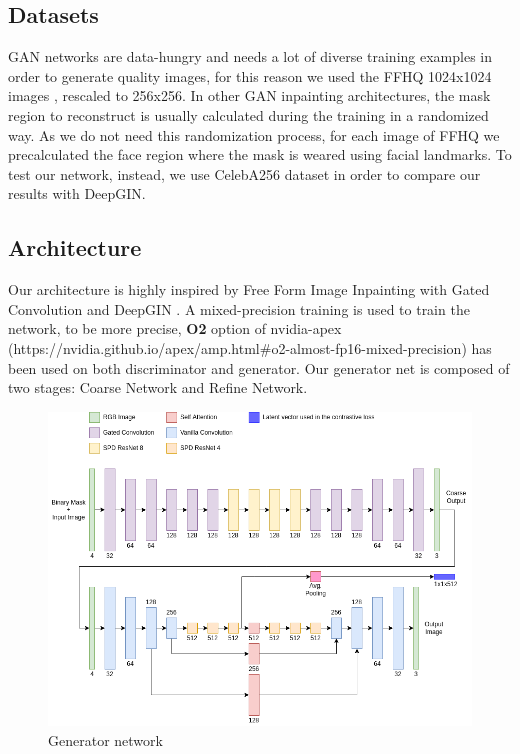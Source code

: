 \documentclass[10pt,twocolumn,letterpaper]{article}
\begin{document}
\subsection{Datasets}
GAN networks are data-hungry and needs a lot of diverse training examples in
order to generate quality images, for this reason we used the FFHQ 1024x1024
images \cite{karras2019style}, rescaled to 256x256.  In other GAN inpainting
architectures, the mask region to reconstruct is usually calculated during the
training in a randomized way.  As we do not need this randomization process, for
each image of FFHQ we precalculated the face region where the mask is weared
using facial landmarks. To test our network, instead, we use CelebA256 dataset
in order to compare our results with DeepGIN.

\subsection{Architecture}
Our architecture is highly inspired by Free Form Image Inpainting with Gated
Convolution \cite{yu2019free} and DeepGIN \cite{li2020deepgin}.
A mixed-precision training is used to train the network, to be more precise,
\textbf{O2} option of nvidia-apex
(https://nvidia.github.io/apex/amp.html\#o2-almost-fp16-mixed-precision) has
been used on both discriminator and generator.
Our generator net is composed of two stages: Coarse Network and Refine Network.
\begin{figure}
  \includegraphics[width=1\linewidth]{img/generator.png}
  \caption{Generator network}
  \label{fig:generator}
\end{figure}
\end{document}

